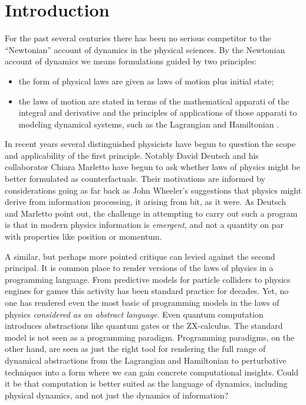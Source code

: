 \section{Introduction}\label{sec:introduction} %
For the past several centuries there has been no serious competitor to
the ``Newtonian'' account of dynamics in the physical sciences. By the
Newtonian account of dynamics we means formulations guided by two principles:
\begin{itemize}
  \item the form of physical laws are given as laws of motion plus initial state;
  \item the laws of motion are stated in terms of the mathematical
    apparati of the integral and derivative and the principles of
    applications of those apparati to modeling dynamical systems, such
    as the Lagrangian and Hamiltonian \cite{DBLP:books/daglib/0015653}.
\end{itemize}
In recent years several distinguished physicists have begun to
question the scope and applicability of the first principle. Notably
David Deutsch \cite{DBLP:journals/synthese/Deutsch13} and his collaborator Chiara Marletto \cite{RS:journals//Marletto2015} have begun to ask
whether laws of physics might be better formulated as
counterfactuals. Their motivations are informed by considerations
going as far back as John Wheeler's suggestions that physics might
derive from information processing, it arising from bit, as it
were. As Deutsch and Marletto point out, the challenge in attempting
to carry out such a program is that in modern physics information is
\emph{emergent}, and not a quantity on par with properties like
position or momentum.

A similar, but perhaps more pointed critique can levied against the
second principal. It is common place to render versions of the laws of
physics in a programming language. From predictive models for particle
colliders to physics engines for games this activity has been standard
practice for decades. Yet, no one has rendered even the most basic of
programming models in the laws of physics \emph{considered as an
  abstract language}. Even quantum computation introduces abstractions
like quantum gates or the ZX-calculus. The standard model is not seen
as a programming paradigm. Programming paradigms, on the other hand,
are seen as just the right tool for rendering the full range of
dynamical abstractions from the Lagrangian and Hamiltonian to
perturbative techniques into a form where we can gain concrete
computational insights. Could it be that computation is better suited
as the language of dynamics, including physical dynamics, and not just
the dynamics of information?

